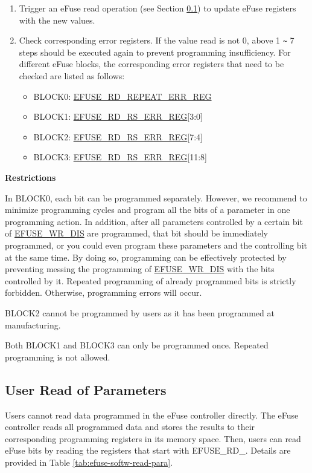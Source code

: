\documentclass[main\_\_EN.tex]{subfiles}
\begin{document}
\begin{enumerate}
\item Trigger an eFuse read operation (see Section \ref{sec:efuse-software-read-para}) to update eFuse registers with the new values.
\item Check corresponding error registers. If the value read is not 0, above 1 \verb+~+ 7 steps should be executed again to prevent programming insufficiency. For different eFuse blocks, the corresponding error registers that need to be checked are listed as follows:
\begin{itemize}
    \item BLOCK0: \hyperref[regdesc:EFUSERDREPEATERRREG]{EFUSE\_RD\_REPEAT\_ERR\_REG}
    \item BLOCK1: \hyperref[regdesc:EFUSERDRSERRREG]{EFUSE\_RD\_RS\_ERR\_REG}[3:0]
    \item BLOCK2: \hyperref[regdesc:EFUSERDRSERRREG]{EFUSE\_RD\_RS\_ERR\_REG}[7:4]
    \item BLOCK3: \hyperref[regdesc:EFUSERDRSERRREG]{EFUSE\_RD\_RS\_ERR\_REG}[11:8]
\end{itemize}
\end{enumerate}


{\bfseries Restrictions}

In BLOCK0, each bit can be programmed separately. However, we recommend to minimize programming cycles and program all the bits of a parameter in one programming action. In addition, after all parameters controlled by a certain bit of \hyperref[fielddesc:EFUSEWRDIS]{EFUSE\_WR\_DIS} are programmed, that bit should be immediately programmed, or you could even program these parameters and the controlling bit at the same time. By doing so, programming can be effectively protected by preventing messing the programming of \hyperref[fielddesc:EFUSEWRDIS]{EFUSE\_WR\_DIS} with the bits controlled by it. Repeated programming of already programmed bits is strictly forbidden. Otherwise, programming errors will occur.

BLOCK2 cannot be programmed by users as it has been programmed at manufacturing.

Both BLOCK1 and BLOCK3 can only be programmed once. Repeated programming is not allowed.


\subsection{User Read of Parameters}
\label{sec:efuse-software-read-para}

Users cannot read data programmed in the eFuse controller directly. The eFuse controller reads all programmed data and stores the results to their corresponding programming registers in its memory space. Then, users can read eFuse bits by reading the registers that start with EFUSE\_RD\_. Details are provided in Table \ref{tab:efuse-softw-read-para}.
\end{document}
